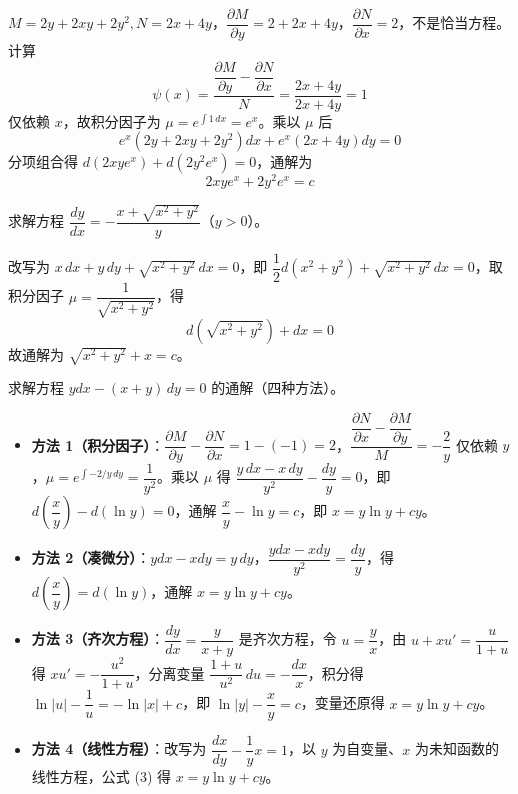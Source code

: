 \begin{solution}
$M = 2y + 2xy + 2y^2, N = 2x + 4y$，$\dfrac{\partial M}{\partial y} = 2 + 2x + 4y$，$\dfrac{\partial N}{\partial x} = 2$，不是恰当方程。计算
$$\psi(x) = \frac{\dfrac{\partial M}{\partial y} - \dfrac{\partial N}{\partial x}}{N} = \frac{2x + 4y}{2x + 4y} = 1$$
仅依赖 $x$，故积分因子为 $\mu = e^{\int 1\,dx} = e^x$。乘以 $\mu$ 后
$$e^x(2y + 2xy + 2y^2)dx + e^x(2x + 4y)dy = 0$$
分项组合得 $d(2xye^x) + d(2y^2e^x) = 0$，通解为
$$2xye^x + 2y^2e^x = c$$
\end{solution}

\begin{example}
求解方程 $\dfrac{dy}{dx} = -\dfrac{x + \sqrt{x^2 + y^2}}{y}$（$y > 0$）。
\end{example}

\begin{solution}
改写为 $x\,dx + y\,dy + \sqrt{x^2+y^2}\,dx = 0$，即 $\dfrac{1}{2}d(x^2+y^2) + \sqrt{x^2+y^2}\,dx = 0$，取积分因子 $\mu = \dfrac{1}{\sqrt{x^2+y^2}}$，得
$$d\left(\sqrt{x^2+y^2}\right) + dx = 0$$
故通解为 $\sqrt{x^2+y^2} + x = c$。
\end{solution}

\begin{example}
求解方程 $ydx - (x + y)\,dy = 0$ 的通解（四种方法）。
\end{example}

\begin{solution}
\begin{itemize}
    \item \textbf{方法 1（积分因子）}：$\dfrac{\partial M}{\partial y} - \dfrac{\partial N}{\partial x} = 1 - (-1) = 2$，$\dfrac{\dfrac{\partial N}{\partial x} - \dfrac{\partial M}{\partial y}}{M} = -\dfrac{2}{y}$ 仅依赖 $y$，$\mu = e^{\int -2/y\,dy} = \dfrac{1}{y^2}$。乘以 $\mu$ 得 $\dfrac{y\,dx - x\,dy}{y^2} - \dfrac{dy}{y} = 0$，即 $d\left(\dfrac{x}{y}\right) - d(\ln y) = 0$，通解 $\dfrac{x}{y} - \ln y = c$，即 $x = y\ln y + cy$。
    \item \textbf{方法 2（凑微分）}：$ydx - xdy = y\,dy$，$\dfrac{ydx - xdy}{y^2} = \dfrac{dy}{y}$，得 $d\left(\dfrac{x}{y}\right) = d(\ln y)$，通解 $x = y\ln y + cy$。
    \item \textbf{方法 3（齐次方程）}：$\dfrac{dy}{dx} = \dfrac{y}{x + y}$ 是齐次方程，令 $u = \dfrac{y}{x}$，由 $u + xu' = \dfrac{u}{1+u}$ 得 $xu' = -\dfrac{u^2}{1+u}$，分离变量 $\dfrac{1+u}{u^2}\,du = -\dfrac{dx}{x}$，积分得 $\ln|u| - \dfrac{1}{u} = -\ln|x| + c$，即 $\ln|y| - \dfrac{x}{y} = c$，变量还原得 $x = y\ln y + cy$。
    \item \textbf{方法 4（线性方程）}：改写为 $\dfrac{dx}{dy} - \dfrac{1}{y}x = 1$，以 $y$ 为自变量、$x$ 为未知函数的线性方程，公式 (3) 得 $x = y\ln y + cy$。
\end{itemize}
\end{solution}

